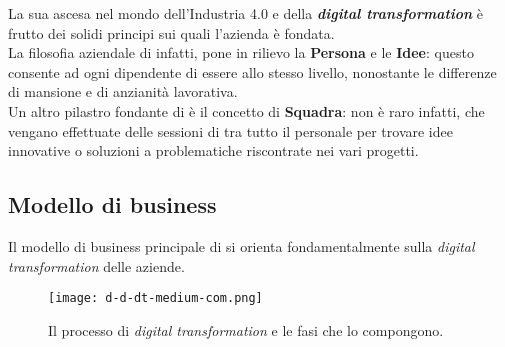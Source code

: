 La sua ascesa nel mondo dell'Industria 4.0 e della \textbf{\textit{digital transformation}} è frutto dei solidi principi sui quali l'azienda è fondata.\\
La filosofia aziendale di \AD{} infatti, pone in rilievo la \textbf{Persona} e le \textbf{Idee}: questo consente ad ogni dipendente di essere allo stesso livello, nonostante le differenze di mansione e di anzianità lavorativa.\\
Un altro pilastro fondante di \AD{} è il concetto di \textbf{Squadra}: non è raro infatti, che vengano effettuate delle sessioni di  tra tutto il personale per trovare idee innovative o soluzioni a problematiche riscontrate nei vari progetti.\\

\subsection{Modello di business}
Il modello di business principale di \AD{} si orienta fondamentalmente sulla \textit{digital transformation} delle aziende.\\

\begin{figure}[h]
\texttt{[image: d-d-dt-medium-com.png]}
\centering
\caption{Il processo di \textit{digital transformation} e le fasi che lo compongono.} 
\label{fig:digital-transformation}
\end{figure}

